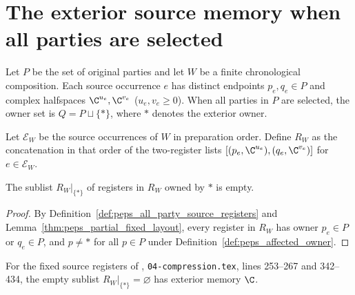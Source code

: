 \section{The exterior source memory when all parties are selected}

Let $P$ be the set of original parties and let $W$ be a finite chronological
composition. Each source occurrence $e$ has distinct endpoints $p_e,q_e\in P$
and complex halfspaces $\C^{u_e},\C^{v_e}$ ($u_e,v_e\ge 0$). When all parties
in $P$ are selected, the owner set is $Q=P\sqcup\{*\}$, where $*$ denotes the
exterior owner.

\begin{definition}
    \label{def:peps_all_party_source_registers}
    \leanok
    Let $\mathcal E_W$ be the source occurrences of $W$ in preparation order.
    Define $R_W$ as the concatenation in that order of the two-register lists
    $[(p_e,\C^{u_e}),(q_e,\C^{v_e})]$ for $e\in\mathcal E_W$.
\end{definition}

\begin{lemma}
    \label{thm:peps_all_party_source_exterior_empty}
    \leanok
    The sublist $R_W|_{\{*\}}$ of registers in $R_W$ owned by $*$ is empty.
\end{lemma}

\begin{proof}\leanok
    By Definition~\ref{def:peps_all_party_source_registers} and
    Lemma~\ref{thm:peps_partial_fixed_layout}, every register in $R_W$ has
    owner $p_e\in P$ or $q_e\in P$, and $p\neq *$ for all $p\in P$ under
    Definition~\ref{def:peps_affected_owner}.
\end{proof}

For the fixed source registers of
\cite[proof of Theorem~5.2]{OpenAI2026PolynomialPEPS},
\texttt{04-compression.tex}, lines 253--267 and 342--434,
the empty sublist $R_W|_{\{*\}}=\varnothing$ has exterior memory $\C$.

